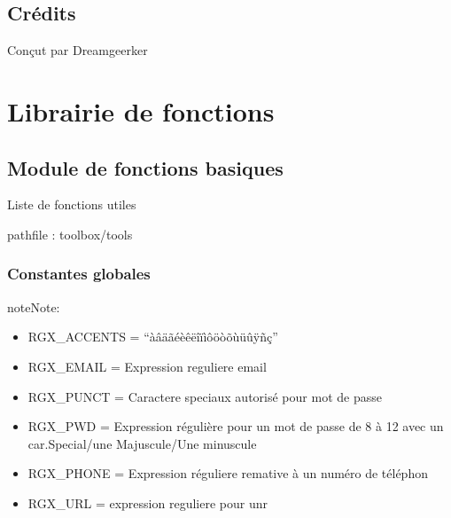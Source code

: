 \documentclass[letterpaper,10pt,french]{sphinxmanual}
\begin{document}
\section{Crédits}
\label{\detokenize{readme:credits}}
Conçut par Dreamgeerker


\chapter{Librairie de fonctions}
\label{\detokenize{modules/tools:module-toolbox.tools}}\label{\detokenize{modules/tools:librairie-de-fonctions}}\label{\detokenize{modules/tools::doc}}

\section{Module de fonctions basiques}
\label{\detokenize{modules/tools:module-de-fonctions-basiques}}
Liste de fonctions utiles

pathfile : toolbox/tools


\subsection{Constantes globales}
\label{\detokenize{modules/tools:constantes-globales}}
\begin{sphinxadmonition}{note}{Note:}\begin{itemize}
\item {} 
RGX\_ACCENTS = “àâäãéèêëîïìôöòõùüûÿñç”

\item {} 
RGX\_EMAIL = Expression reguliere email

\item {} 
RGX\_PUNCT = Caractere speciaux autorisé pour mot de passe

\item {} 
RGX\_PWD = Expression régulière pour un mot de passe de 8 à 12 avec un car.Special/une Majuscule/Une minuscule

\item {} 
RGX\_PHONE = Expression réguliere remative à un numéro de téléphon

\item {} 
RGX\_URL = expression reguliere pour unr

\end{itemize}
\end{sphinxadmonition}
\end{document}
